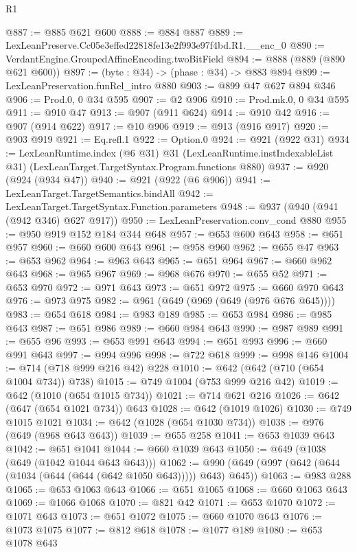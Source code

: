 \begin{lexlean}{R1}
\begin{coremodule}
@887 := @885 @621 @600
@888 := @884 @887
@889 := LexLeanPreserve.Cc05e3effed22818fe13e2f993e97f4bd.R1.__enc_0
@890 := VerdantEngine.GroupedAffineEncoding.twoBitField
@894 := @888 (@889 (@890 @621 @600))
@897 := (byte : @34) -> (phase : @34) -> @883 @894
@899 := LexLeanPreservation.funRel_intro @880
@903 := @899 @47 @627 @894 @346
@906 := Prod.{0, 0} @34 @595
@907 := @2 @906
@910 := Prod.mk.{0, 0} @34 @595
@911 := @910 @47
@913 := @907 (@911 @624)
@914 := @910 @42
@916 := @907 (@914 @622)
@917 := @10 @906
@919 := @913 (@916 @917)
@920 := @903 @919
@921 := Eq.refl.{1}
@922 := Option.{0}
@924 := @921 (@922 @31)
@934 := LexLeanRuntime.index
    (@6 @31)
    @31
    (LexLeanRuntime.instIndexableList @31)
    (LexLeanTarget.TargetSyntax.Program.functions @880)
@937 := @920 (@924 (@934 @47))
@940 := @921 (@922 (@6 @906))
@941 := LexLeanTarget.TargetSemantics.bindAll
@942 := LexLeanTarget.TargetSyntax.Function.parameters
@948 := @937 (@940 (@941 (@942 @346) @627 @917))
@950 := LexLeanPreservation.conv_cond @880
@955 := @950 @919 @152 @184 @344 @648
@957 := @653 @600 @643
@958 := @651 @957
@960 := @660 @600 @643
@961 := @958 @960
@962 := @655 @47
@963 := @653 @962
@964 := @963 @643
@965 := @651 @964
@967 := @660 @962 @643
@968 := @965 @967
@969 := @968 @676
@970 := @655 @52
@971 := @653 @970
@972 := @971 @643
@973 := @651 @972
@975 := @660 @970 @643
@976 := @973 @975
@982 := @961 (@649 (@969 (@649 (@976 @676 @645))))
@983 := @654 @618
@984 := @983 @189
@985 := @653 @984
@986 := @985 @643
@987 := @651 @986
@989 := @660 @984 @643
@990 := @987 @989
@991 := @655 @96
@993 := @653 @991 @643
@994 := @651 @993
@996 := @660 @991 @643
@997 := @994 @996
@998 := @722 @618
@999 := @998 @146
@1004 := @714 (@718 @999 @216 @42) @228
@1010 := @642 (@642 (@710 (@654 @1004 @734)) @738)
@1015 := @749 @1004 (@753 @999 @216 @42)
@1019 := @642 (@1010 (@654 @1015 @734))
@1021 := @714 @621 @216
@1026 := @642 (@647 (@654 @1021 @734)) @643
@1028 := @642 (@1019 @1026)
@1030 := @749 @1015 @1021
@1034 := @642 (@1028 (@654 @1030 @734))
@1038 := @976 (@649 (@968 @643 @643))
@1039 := @655 @258
@1041 := @653 @1039 @643
@1042 := @651 @1041
@1044 := @660 @1039 @643
@1050 := @649 (@1038 (@649 (@1042 @1044 @643 @643)))
@1062 := @990 (@649 (@997 (@642 (@644 (@1034 (@644 (@644 (@642 @1050 @643))))) @643) @645))
@1063 := @983 @288
@1065 := @653 @1063 @643
@1066 := @651 @1065
@1068 := @660 @1063 @643
@1069 := @1066 @1068
@1070 := @821 @42
@1071 := @653 @1070
@1072 := @1071 @643
@1073 := @651 @1072
@1075 := @660 @1070 @643
@1076 := @1073 @1075
@1077 := @812 @618
@1078 := @1077 @189
@1080 := @653 @1078 @643

\end{coremodule}
\end{lexlean}
